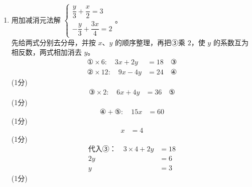 \documentclass[12pt,a4paper,fontset=none]{exam-zh}
\begin{document}
\begin{solution}
    \begin{enumerate}[label=(\alph*)]
        \item 用加减消元法解 $\begin{cases} \dfrac{y}{3} + \dfrac{x}{2} = 3 \\[2ex] -\dfrac{y}{3} + \dfrac{3x}{4} = 2 \end{cases}$。 \\
        先给两式分别去分母，并按 $x$、$y$ 的顺序整理，再把③乘 $2$，使 $y$ 的系数互为相反数，两式相加消去 $y$。 \\
        \begin{align*}
            \text{①}\times6:\quad 3x + 2y &= 18 \quad \text{③} \\
            \text{②}\times12:\quad 9x - 4y &= 24 \quad \text{④}
        \end{align*}
        \hfill (1分) \\
        \begin{align*}
            \text{③}\times2:\quad 6x + 4y &= 36 \quad \text{⑤}
        \end{align*}
        \hfill (1分) \\
        \begin{align*}
            \text{④}+\text{⑤}:\quad 15x &= 60
        \end{align*}
        \hfill (1分) \\
        \begin{align*}
            x &= 4
        \end{align*}
        \hfill (1分) \\
        \begin{align*}
            \text{代入③：}\quad 3\times4 + 2y &= 18 \\
            2y &= 6 \\
            y &= 3
        \end{align*}
        \hfill (1分)


\end{enumerate}
\end{solution}
\end{document}
